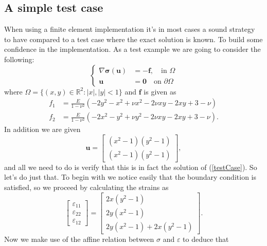 \documentclass[paper=a4, fontsize=11pt]{scrartcl} %
\begin{document}
\subsection*{A simple test case}
When using a finite element implementation it's in most cases a sound strategy to have compared to a test case where the exact solution is known. To build some confidence in the implementation. As a test example we are going to consider the following:
\begin{equation}
\label{testCase}
\begin{cases}\nabla \boldsymbol{\sigma}(\boldsymbol{u}) &= -\boldsymbol{f}, \quad \text{in } \Omega \\
\boldsymbol{u} &= \boldsymbol{0} \quad \text{on } \partial \Omega
\end{cases}
\end{equation}
where $\Omega = \{(x,y)\in \mathbb{R}^2: |x|,|y|<1\}$ and $\boldsymbol{f}$ is given as
\begin{align*}
f_1 &= \frac{E}{1-\nu^2}\left(-2y^2-x^2+\nu x^2-2\nu xy - 2xy + 3 - \nu\right) \\
f_2 &= \frac{E}{1-\nu^2}\left(-2x^2-y^2+\nu y^2-2\nu xy - 2xy + 3 - \nu\right).
\end{align*}
In addition we are given
\begin{equation*}
\boldsymbol{u} = \begin{bmatrix}
(x^2-1)(y^2-1) \\ (x^2-1)(y^2-1)
\end{bmatrix},
\end{equation*}
and all we need to do is verify that this is in fact the solution of (\ref{testCase}). So let's do just that. To begin with we notice easily that the boundary condition is satisfied, so we proceed by calculating the strains as
\begin{equation*}
\begin{bmatrix}
\varepsilon_{11} \\
\varepsilon_{22} \\
\varepsilon_{12}
\end{bmatrix}
=
\begin{bmatrix}
2x(y^2-1) \\
2y(x^2-1) \\
2y(x^2-1)+2x(y^2-1)
\end{bmatrix}.
\end{equation*}
Now we make use of the affine relation between $\sigma$ and $\varepsilon$ to deduce that
\end{document}
